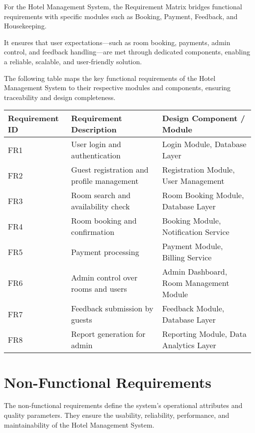 \documentclass[a4paper,12pt]{article}
\begin{document}
For the Hotel Management System, the Requirement Matrix bridges functional requirements with specific modules such as Booking, Payment, Feedback, and Housekeeping.

It ensures that user expectations—such as room booking, payments, admin control, and feedback handling—are met through dedicated components, enabling a reliable, scalable, and user-friendly solution.

The following table maps the key functional requirements of the Hotel Management System to their respective modules and components, ensuring traceability and design completeness.

\begin{center}
\begin{tabular}{|p{4cm}|p{5cm}|p{5cm}|}
\hline
\textbf{Requirement ID} & \textbf{Requirement Description} & \textbf{Design Component / Module} \\
\hline
FR1 & User login and authentication & Login Module, Database Layer \\
\hline
FR2 & Guest registration and profile management & Registration Module, User Management \\
\hline
FR3 & Room search and availability check & Room Booking Module, Database Layer \\
\hline
FR4 & Room booking and confirmation & Booking Module, Notification Service \\
\hline
FR5 & Payment processing & Payment Module, Billing Service \\
\hline
FR6 & Admin control over rooms and users & Admin Dashboard, Room Management Module \\
\hline
FR7 & Feedback submission by guests & Feedback Module, Database Layer \\
\hline
FR8 & Report generation for admin & Reporting Module, Data Analytics Layer \\
\hline
\end{tabular}
\end{center}

\section{Non-Functional Requirements}

The non-functional requirements define the system's operational attributes and quality parameters. They ensure the usability, reliability, performance, and maintainability of the Hotel Management System.
\end{document}
